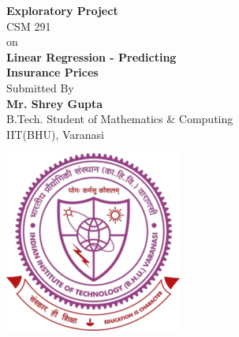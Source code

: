 \documentclass[12pt]{article}
\numberwithin{equation}{section}
\begin{document}
	\begin{center}
		\Huge{\bf Exploratory Project}\\
		\Large{CSM 291}\\
		\vspace{1cm}
		on\\
		\vspace{1cm}
		\textbf{\Huge{Linear Regression - Predicting}}\\
		\textbf{\Huge{Insurance Prices}}\\
		\vspace{3cm}
		\Large{Submitted By}\\
		\vspace{1cm}
		\textbf{\Large{Mr. Shrey Gupta}}\\
		\Large{B.Tech. Student of Mathematics \& Computing }\\
		\large{IIT(BHU), Varanasi}
		\vspace{2cm}
		
		\includegraphics[scale=2.5]{iitbhu.png}
	\end{center}
	\thispagestyle{empty}
	\cleardoublepage
\setcounter{page}{1}

	\newpage
\end{document}

